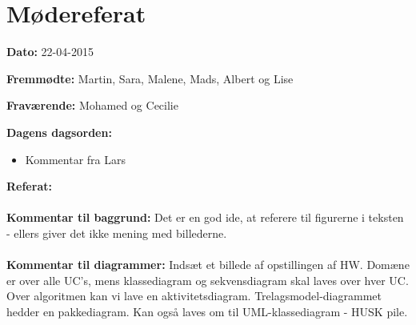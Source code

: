 \chapter{Mødereferat}

\textbf{Dato:} 22-04-2015

\textbf{Fremmødte:} Martin, Sara, Malene, Mads, Albert og Lise 

\textbf{Fraværende:} Mohamed og Cecilie

\textbf{Dagens dagsorden:}
\begin{itemize}
	\item Kommentar fra Lars
\end{itemize}

\textbf{Referat:}
\\
\\
\textbf{Kommentar til baggrund:} Det er en god ide, at referere til figurerne i teksten - ellers giver det ikke mening med billederne. 
\\
\\
\textbf{Kommentar til diagrammer:} Indsæt et billede af opstillingen af HW. 
Domæne er over alle UC's, mens klassediagram og sekvensdiagram skal laves over hver UC. 
Over algoritmen kan vi lave en aktivitetsdiagram. 
Trelagsmodel-diagrammet hedder en pakkediagram. Kan også laves om til UML-klassediagram - HUSK pile. 



